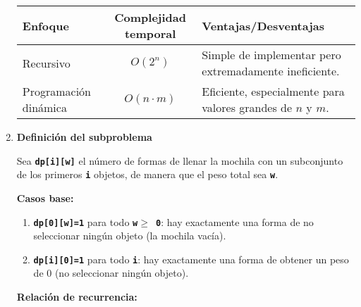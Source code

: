 \begin{enumerate}[label=\color{red}\textbf{\arabic*)}]
\begin{center}
\begin{tabular}{|l|c|p{5cm}|}
    \textbf{Enfoque} & \textbf{Complejidad temporal} & \textbf{Ventajas/Desventajas}\\ \hline
    Recursivo & $O(2^n)$ & Simple de implementar pero extremadamente ineficiente.\\ \hline
    Programación dinámica & $O(n\cdot m)$ & Eficiente, especialmente para valores grandes de $n$ y  $m$.\\ \hline
  \end{tabular}
\end{center}
\item {} 

  \textbf{Definición del subproblema}

  Sea \textbf{\texttt{dp[i][w]}} el número de formas de llenar la mochila con un subconjunto de los primeros \textbf{\texttt{i}} objetos, de manera que el peso total sea \textbf{\texttt{w}}.

  \textbf{Casos base:}
  \begin{enumerate}[label=\arabic*)]
    \item \textbf{\texttt{dp[0][w]=1}} para todo \textbf{\texttt{w$\ge$ 0}}: hay exactamente una forma de no seleccionar ningún objeto (la mochila vacía).
    \item \textbf{\texttt{dp[i][0]=1}} para todo \textbf{\texttt{i}}: hay exactamente una forma de obtener un peso de $0$ (no seleccionar ningún objeto).
  \end{enumerate}
  \textbf{Relación de recurrencia:} 
        

\end{enumerate}
